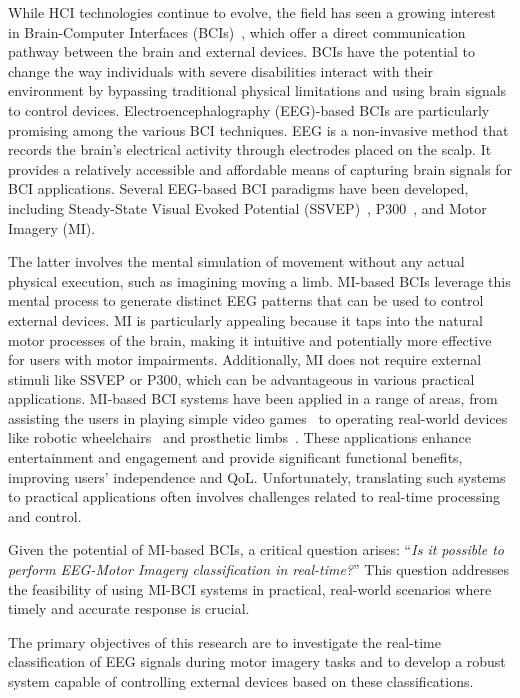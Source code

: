 While HCI technologies continue to evolve, the field has seen a growing interest in Brain-Computer Interfaces (BCIs)~\cite{yadav2020comprehensive}, which offer a direct communication pathway between the brain and external devices. 
BCIs have the potential to change the way individuals with severe disabilities interact with their environment by bypassing traditional physical limitations and using brain signals to control devices.
Electroencephalography (EEG)-based BCIs are particularly promising among the various BCI techniques. 
EEG is a non-invasive method that records the brain's electrical activity through electrodes placed on the scalp. 
It provides a relatively accessible and affordable means of capturing brain signals for BCI applications. 
Several EEG-based BCI paradigms have been developed, including Steady-State Visual Evoked Potential (SSVEP)~\cite{BCI_SSVEP_P300}, P300~\cite{BCI_SSVEP_P300}, and Motor Imagery (MI).

The latter involves the mental simulation of movement without any actual physical execution, such as imagining moving a limb. 
MI-based BCIs leverage this mental process to generate distinct EEG patterns that can be used to control external devices. 
MI is particularly appealing because it taps into the natural motor processes of the brain, making it intuitive and potentially more effective for users with motor impairments. 
Additionally, MI does not require external stimuli like SSVEP or P300, which can be advantageous in various practical applications.
MI-based BCI systems have been applied in a range of areas, from assisting the users in playing simple video games~\cite{10174453} to operating real-world devices like robotic wheelchairs~\cite{palumbo2021motor} and prosthetic limbs~\cite{10453986}.
These applications enhance entertainment and engagement and provide significant functional benefits, improving users' independence and QoL.
Unfortunately, translating such systems to practical applications often involves challenges related to real-time processing and control.

Given the potential of MI-based BCIs, a critical question arises: ``\emph{Is it possible to perform EEG-Motor Imagery classification in real-time?}'' 
This question addresses the feasibility of using MI-BCI systems in practical, real-world scenarios where timely and accurate response is crucial.

The primary objectives of this research are to investigate the real-time classification of EEG signals during motor imagery tasks and to develop a robust system capable of controlling external devices based on these classifications. 

